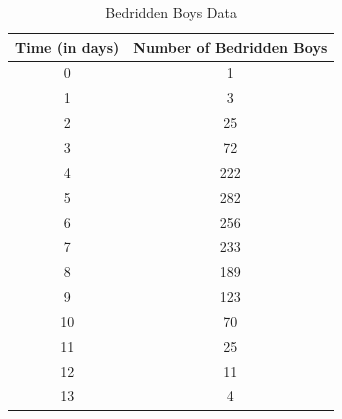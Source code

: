 \begin{table}[ht!]
    \centering
    \begin{tabular}{|c|c|}
        \hline
       Time (in days) &  Number of Bedridden Boys \\ \hline \hline
       0  & 1\\\hline
       1  & 3\\\hline
       2  & 25\\\hline
       3  & 72\\\hline
       4  & 222\\\hline
       5  & 282\\\hline
       6  & 256\\\hline
       7  & 233\\\hline
       8  & 189\\\hline
       9  & 123\\\hline
       10 & 70\\\hline
       11 & 25\\\hline
       12 & 11\\\hline
       13 & 4\\\hline
    \end{tabular}
    \caption{Bedridden Boys Data}
    \label{tab:bedridden_boys}
\end{table}


